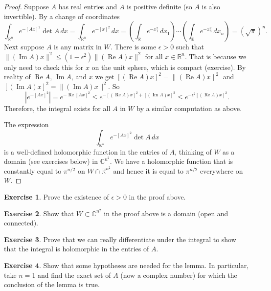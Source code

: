 \documentclass[12pt,openany]{book}
\renewcommand{\Re}{\operatorname{Re}}
\renewcommand{\Im}{\operatorname{Im}}
\newcommand{\snorm}[1]{\lVert {#1} \rVert}
\newcommand{\abs}[1]{\left\lvert {#1} \right\rvert}
\newcommand{\C}{{\mathbb{C}}}
\newcommand{\R}{{\mathbb{R}}}
\theoremstyle{plain}
\theoremstyle{remark}
\theoremstyle{definition}
\newenvironment{exbox}{%
    \def\FrameCommand{\vrule width 1pt \relax\hspace{10pt}}%
    \MakeFramed{\advance\hsize-\width\FrameRestore}%
}{%
    \endMakeFramed
}
\theoremstyle{exercise}
\newtheorem{exercise}{Exercise}[section]
\theoremstyle{example}
\begin{document}
\begin{proof}
Suppose $A$ has real entries and $A$ is positive definite (so
$A$ is also invertible).  By a
change of coordinates
\begin{equation*}
\int_{\R^n} e^{-{[Ax]}^2} \det A \, dx  =
\int_{\R^n} e^{-{[x]}^2} \, dx  =
\left(\int_\R e^{-x_1^2} \, dx_1 \right)
\cdots
\left(\int_\R e^{-x_n^2} \, dx_n \right)
=
{(\sqrt{\pi})}^n .
\end{equation*}
Next suppose $A$ is any matrix in $W$.
There is some $\epsilon > 0$
such that $\snorm{(\Im A) x}^2 \leq
(1-\epsilon^2) \snorm{(\Re A) x}^2$ for all $x \in \R^n$.  That is because
we only need to check this for $x$ on the unit sphere, which is compact
(exercise).  By reality of $\Re A$, $\Im A$, and $x$
we get
${[(\Re A)x]}^2 = \snorm{(\Re A)x}^2$ and
${[(\Im A)x]}^2 = \snorm{(\Im A)x}^2$.  So
\begin{equation*}
\abs{e^{-{[Ax]}^2}}
=
e^{-\Re {[Ax]}^2}
\leq
e^{-{[(\Re A)x]}^2 + {[(\Im A)x]}^2}
\leq
e^{-\epsilon^2 {[(\Re A)x]}^2} .
\end{equation*}
Therefore, the integral exists for all $A$ in $W$ by a similar computation as
above.

The expression
\begin{equation*}
\int_{\R^n} e^{-{[Ax]}^2} \det A \, dx
\end{equation*}
is a well-defined holomorphic function in the entries of $A$, thinking of
$W$ as a domain (see exercises below) in $\C^{n^2}$.  We have a holomorphic function that is
constantly equal to $\pi^{n/2}$ on $W \cap \R^{n^2}$ and hence it is equal
to $\pi^{n/2}$ everywhere on $W$.
\end{proof}

\begin{exbox}
\begin{exercise}
Prove the existence of $\epsilon > 0$ in the proof above.
\end{exercise}

\begin{exercise}
Show that $W \subset \C^{n^2}$ in the proof above is a domain (open and connected).
\end{exercise}

\begin{exercise}
Prove that we can really differentiate under the integral to show that the
integral is holomorphic in the entries of $A$.
\end{exercise}

\begin{exercise}
Show that some hypotheses are needed for the lemma.  In particular, take
$n=1$ and find the exact set of $A$ (now a complex number) for which
the conclusion of the lemma is true.
\end{exercise}
\end{exbox}
\end{document}

